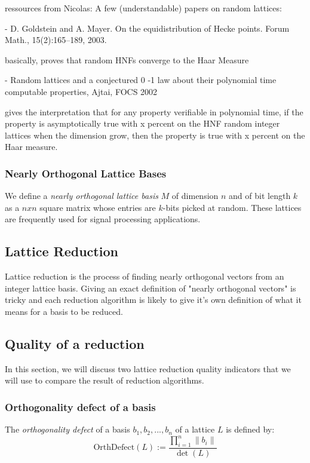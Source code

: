 \documentclass[10pt]{article}
\begin{document}
ressources from Nicolas:
A few (understandable) papers on random lattices:

- D. Goldstein and A. Mayer. On the equidistribution of Hecke points.
Forum Math., 15(2):165–189, 2003.

basically, proves that random HNFs converge to the Haar Measure

- Random lattices and a conjectured 0 -1 law about their polynomial time
computable properties, Ajtai, FOCS 2002

gives the interpretation that for any property verifiable in polynomial
time,
if the property is asymptotically true with x percent on the HNF random
integer lattices when the dimension grow,
then the property is true with x percent on the Haar measure.

\subsubsection{Nearly Orthogonal Lattice Bases}

We define a \emph{nearly orthogonal lattice basis} $M$ of dimension $n$ and of bit length $k$ as a $nxn$ square matrix whose entries are $k$-bits picked at random. These lattices are frequently used for signal processing applications\cite{originalJacobiMethodLatticeBasisReduction}.

\subsection{Lattice Reduction}

Lattice reduction is the process of finding nearly orthogonal vectors from an integer lattice basis. Giving an exact definition of "nearly orthogonal vectors" is tricky and each reduction algorithm is likely to give it's own definition of what it means for a basis to be reduced.

\subsection{Quality of a reduction}

In this section, we will discuss two lattice reduction quality indicators that we will use to compare the result of reduction algorithms.

\subsubsection{Orthogonality defect of a basis}
The \emph{orthogonality defect} of a basis $b_1, b_2,...,b_n$ of a lattice $L$ is defined by:
\[
    \text{OrthDefect}(L) := \frac{\displaystyle\prod^{n}_{i=1} \|b_i\| }{\det(L)}
\]
\end{document}
